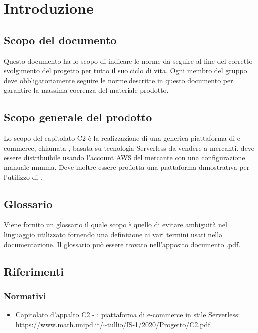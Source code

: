 
\section{Introduzione}
\subsection{Scopo del documento}
Questo documento ha lo scopo di indicare le norme da seguire al fine del corretto svolgimento del progetto per tutto il suo ciclo di vita. 
Ogni membro del gruppo \Omicron{} deve obbligatoriamente seguire le norme descritte in questo documento per garantire la massima coerenza del materiale prodotto.

\subsection{Scopo generale del prodotto}
Lo scopo del capitolato C2 è la realizzazione di una generica piattaforma di e-commerce, chiamata \nameproject{}, basata su tecnologia Serverless da vendere a mercanti. \nameproject{} deve essere distribuibile usando l'account AWS del mercante con una configurazione manuale minima. Deve inoltre essere prodotta una piattaforma dimostrativa per l'utilizzo di \nameproject{}.   

\subsection{Glossario}
Viene fornito un glossario il quale scopo è quello di evitare ambiguità nel linguaggio utilizzato fornendo una definizione ai vari termini usati nella documentazione. Il glossario può essere trovato nell'apposito documento \Glossario{}.pdf.

\subsection{Riferimenti}
\subsubsection{Normativi}
\begin{itemize}
\item Capitolato d'appalto C2 - \nameproject{}: piattaforma di e-commerce in stile Serverless:\\ \url{https://www.math.unipd.it/~tullio/IS-1/2020/Progetto/C2.pdf}.
\end{itemize}

